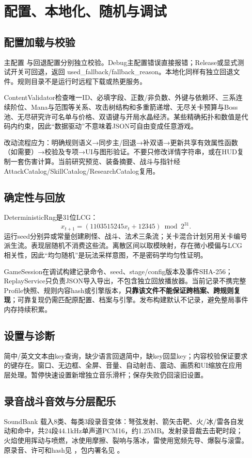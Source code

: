 \documentclass[UTF8,a4paper,11pt,fontset=windows]{ctexart}
\newcommand{\code}[1]{{\small\texttt{\detokenize{#1}}}}
\newcommand{\nextsection}[1]{\par\bigskip\section{#1}}
\begin{document}
\nextsection{配置、本地化、随机与调试}
\subsection{配置加载与校验}
主配置 \code{game_rules.json} 与回退配置分别独立校验。Debug主配置错误直接报错；Release或显式测试开关可回退，返回 used\_fallback/fallback\_reason。本地化同样有独立回退文件。规则目录不是运行时远程下载或热更服务。

ContentValidator检查唯一ID、必填字段、正数/非负数、外键与依赖环、三系连续阶位、Mana与范围等关系、攻击树结构和多重箭递增、无尽关卡预算与Boss池、无尽研究许可名单与价格、双语键与开局水晶经济。某些精确拓扑和数值是代码内约束，因此“数据驱动”不意味着JSON可自由变成任意游戏。

改动流程应为：明确规则语义→同步主/回退→补双语→更新共享有效属性函数（如需要）→校验及专项→UI与图形验证。不要只修改详情字符串，或在HUD复制一套伤害计算。当前研究预览、装备摘要、战斗与指针经 AttackCatalog/SkillCatalog/ResearchCatalog复用。

\subsection{确定性与回放}
DeterministicRng是31位LCG：
\[
x_{t+1}=(1103515245x_t+12345)\bmod2^{31}.
\]
运行seed分别异或常量创建刷怪、战斗、法术三条流；关卡混合计划另用关卡编号派生流。表现层随机不消费这些流。离散区间以取模映射，存在微小模偏与LCG相关性，因此“均匀随机”是玩法采样意图，不是密码学均匀性证明。

GameSession在调试构建记录命令、seed、stage/config版本及事件SHA-256；ReplayService只负责JSON导入导出，不包含独立回放播放器。当前记录不携完整Profile快照、规则内容hash或引擎版本，\textbf{只靠该文件不能保证跨档案、跨规则复现}；可靠复现仍需匹配原配置、档案与引擎。发布构建默认不记录，避免整局事件内存持续积累。

\subsection{设置与诊断}
简中/英文文本由key查询，缺少语言回退简中，缺key回显key；内容校验保证要求的键存在。窗口、无边框、全屏、音量、自动射击、震动、画质和UI缩放在应用层处理。暂停快速设置新增独立音乐滑杆；保存失败仍回滚旧设置。


\subsection{录音战斗音效与分层配乐}
SoundBank 载入8类、每类3段录音变体：弩弦发射、箭矢击靶、火/冰/雷各自发动和命中，共24段44.1kHz单声道PCM16，约1.25MB。发射录音裁去击靶时段；火焰使用挥动与喷燃，冰使用摩擦、裂响与落冰，雷使用宽频先导、爆裂与滚雷。原录音、许可和hash见 ，包内署名见 。
\end{document}
